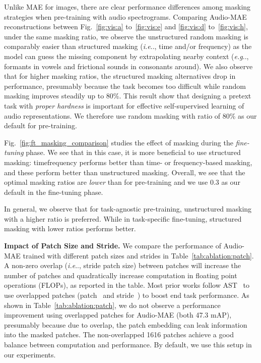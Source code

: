 \documentclass{article}
\makeatletter
\DeclareRobustCommand\onedot{\futurelet\@let@token\@onedot}
\def\@onedot{\ifx\@let@token.\else.\null\fi\xspace}
\def\eg{\emph{e.g}\onedot} \def\Eg{\emph{E.g}\onedot}
\def\ie{\emph{i.e}\onedot} \def\Ie{\emph{I.e}\onedot}
\renewcommand{\paragraph}[1]{\vspace{1.25mm}\noindent\textbf{#1}}
\makeatother
\begin{document}
Unlike MAE for images, there are clear performance differences among masking strategies when pre-training with audio spectrograms.
Comparing Audio-MAE reconstructions between Fig.~\ref{fig:vis:a} to~\ref{fig:vis:e} and \ref{fig:vis:d} to~\ref{fig:vis:h}, under the same masking ratio, we observe the unstructured random masking is comparably easier than structured masking (\ie, time and/or frequency) as the model can guess the missing component by extrapolating nearby context (\eg, formants in vowels and frictional sounds in consonants around). 
We also observe that for higher masking ratios, the structured masking alternatives drop in performance, presumably because the task becomes too difficult while random masking improves steadily up to 80\%.
This result show that designing a pretext task with \emph{proper hardness} is important for effective self-supervised learning of audio representations. 
We therefore use random masking with ratio of 80\% as our default for pre-training.


Fig.~\ref{fig:ft_masking_comparison} studies the effect of masking during the \textit{fine-tuning} phase. We see that in this case, it is more beneficial to use structured masking: timefrequency performs better than time- or frequency-based masking, and these perform better than unstructured masking. 
Overall, we see that the optimal masking ratios are \textit{lower} than for pre-training and we use 0.3 as our default in the fine-tuning phase.

In general, we observe that for task-agnostic pre-training, unstructured masking with a higher ratio is preferred. While in task-specific fine-tuning, structured masking with lower ratios performs better.







\paragraph{Impact of Patch Size and Stride.}
We compare the performance of Audio-MAE trained with different patch sizes and strides in Table~\ref{tab:ablation:patch}. 
A non-zero overlap (\ie, stride  patch size) between patches will increase the number of patches and quadratically increase computation in floating point operations (FLOPs), as reported in the table. 
Most prior works follow AST~\cite{gong2021ast} to use overlapped patches (patch~ and stride~) to boost end task performance.
As shown in Table~\ref{tab:ablation:patch}, 
we do not observe a performance improvement using overlapped patches for Audio-MAE (both 47.3 mAP), presumably because due to overlap, the patch embedding can leak information into the masked patches.
The non-overlapped 1616 patches achieve a good balance between computation and performance. 
By default, we use this setup in our experiments. 
\end{document}

